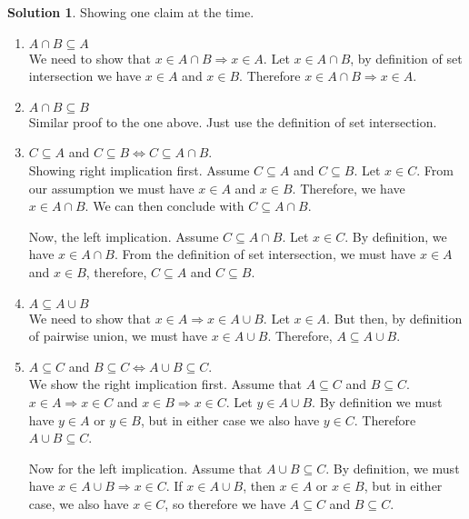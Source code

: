 \documentclass[a4paper, twocolumn]{report}
\theoremstyle{definition}
\theoremstyle{solution}
\newtheorem*{sltn}{Solution}
\newcommand{\union}{\cup}
\newcommand{\intrsct}{\cap}
\begin{document}
\begin{sltn}
  Showing one claim at the time.
  \begin{enumerate}
    \item $A \intrsct B \subseteq A$ \\
      [0.2cm]
      We need to show that $x \in A \intrsct B \Rightarrow x \in A$.  Let $x
      \in A \intrsct B$, by definition of set intersection we have $x \in A$
      and $x \in B$. Therefore $x \in A \intrsct B \Rightarrow x \in A$.

    \item $A \intrsct B \subseteq B$ \\
      [0.2cm]
      Similar proof to the one above. Just use the definition of set
      intersection.
   
    \item $C \subseteq A$ and $ C \subseteq B \Longleftrightarrow C \subseteq A \intrsct B$.\\
      [0.2cm]
      Showing right implication first. Assume $C \subseteq A$ and $C \subseteq
      B$. Let $x \in C$.  From our assumption we must have $x \in A$ and $x \in
      B$. Therefore, we have $x \in A \intrsct B$.  We can then conclude with
      $C \subseteq A \intrsct B$. 

      Now, the left implication. Assume $C \subseteq A \intrsct B$. Let $x \in
      C$.  By definition, we have $x \in A \intrsct B$. From the definition of
      set intersection, we must have $x \in A$ and $x \in B$, therefore, $C
      \subseteq A$ and $C \subseteq B$. 
   
    \item $A \subseteq A \union B$ \\
      [0.2cm]
      We need to show that $x \in A \Rightarrow x \in A \union B$.  Let $x \in
      A$. But then, by definition of pairwise union, we must have $x \in A
      \union B$. Therefore, $A \subseteq A \union B$. 
    
    \item $A \subseteq C$ and $B \subseteq C \Longleftrightarrow A \union B \subseteq C$.\\
      [0.2cm]
      We show the right implication first. Assume that $A \subseteq C$ and $B
      \subseteq C$.  $x \in A \Rightarrow x \in C$ and $x \in B \Rightarrow x
      \in C$. Let $y \in A \union B$.  By definition we must have $y \in A$ or
      $y \in B$, but in either case we also have $y \in C$.  Therefore $A
      \union B \subseteq C$. 

      Now for the left implication. Assume that $A \union B \subseteq C$. By
      definition, we must have $x \in A \union B \Rightarrow x \in C$. If $x
      \in A \union B$, then $x \in A$ or $x \in B$, but in either case, we also
      have $x \in C$, so therefore we have $A \subseteq C$ and $B \subseteq C$.
    
  \end{enumerate}
\end{sltn}
\todos
\end{document}
